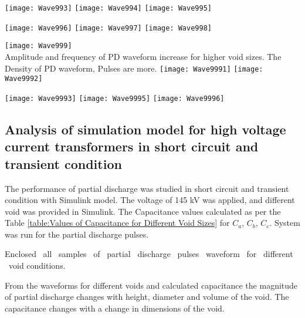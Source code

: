 \pagebreak
\begin{center}
\texttt{[image: Wave993]}
\vfill
\texttt{[image: Wave994]}
\vfill
\texttt{[image: Wave995]}
\end{center}

\pagebreak
\begin{center}
\texttt{[image: Wave996]}
\vfill
\texttt{[image: Wave997]}
\vfill
\texttt{[image: Wave998]}
\end{center}

\pagebreak
\begin{center}
\texttt{[image: Wave999]}\\
Amplitude and frequency of PD waveform increase for higher void sizes. 
The Density of PD waveform, Pulses are more.
\vfill
\texttt{[image: Wave9991]}
\vfill
\texttt{[image: Wave9992]}
\end{center}

\pagebreak
\begin{center}
\texttt{[image: Wave9993]}
\vfill
\texttt{[image: Wave9995]}
\vfill
\texttt{[image: Wave9996]}
\end{center}

\subsection[Analysis of simulation model for high voltage current transformers in short circuit and transient condition]{Analysis of simulation model for high voltage\\current transformers in short circuit and\\transient condition}

The performance of partial discharge was studied in short circuit and transient condition with Simulink model. The voltage of 145 kV was applied, and different void was provided in Simulink. The Capacitance values calculated as per the Table \ref{table:Values of Capacitance for Different Void Sizes} for $C_a$, $C_b$, $C_c$. System was run for the partial discharge pulses\setlength{\parskip}{1em}.

Enclosed ~all ~samples ~of ~partial ~discharge ~pulses ~waveform ~for ~different ~void conditions.

From the waveforms for different voids and calculated capacitance the magnitude of partial discharge changes with height, diameter and volume of the void. The capacitance changes with a change in dimensions of the void.

